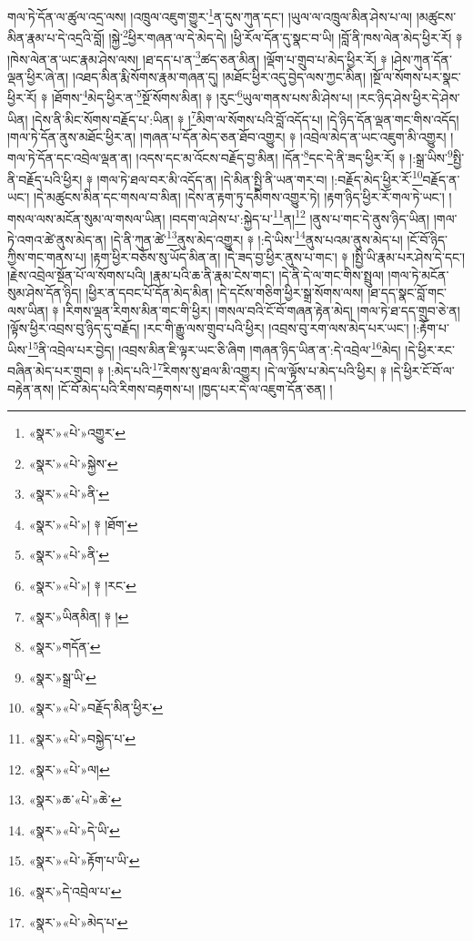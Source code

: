 གལ་ཏེ་དོན་ལ་ཚུལ་འདྲ་ལས། །འཁྲུལ་འཇུག་གྱུར་\footnote{«སྣར་»«པེ་»འགྱུར་}ན་དུས་ཀུན་དང་། །ཡུལ་ལ་འཁྲུལ་མིན་ཤེས་པ་ལ། །མཚུངས་མིན་རྣམ་པ་དེ་འདྲའི་བློ། །སྐྱེ་\footnote{«སྣར་»«པེ་»སྐྱེས་}ཕྱིར་གཞན་ལ་དེ་མེད་དེ། །ཕྱི་རོལ་དོན་དུ་སྣང་བ་ཡི། །བློ་ནི་ཁས་ལེན་མེད་ཕྱིར་རོ། ༈ །ཁེས་ལེན་ན་ཡང་རྣམ་ཤེས་ལས། །ཐ་དད་པ་ན་\footnote{«སྣར་»«པེ་»ནི་}ཚད་ཅན་མིན། །ལྡོག་པ་གྲུབ་པ་མེད་ཕྱིར་རོ། ༈ །ཤེས་ཀུན་དོན་ལྡན་ཕྱིར་ཞེ་ན། །འཐད་མིན་རྨི་སོགས་རྣམ་གཞན་དུ། །མཐོང་ཕྱིར་འདུ་བྱེད་ལས་ཀྱང་མིན། །སྔོ་ལ་སོགས་པར་སྣང་ཕྱིར་རོ། ༈ །ཐོགས་\footnote{«སྣར་»«པེ་»། ༈ །ཐོག་}མེད་ཕྱིར་ན་\footnote{«སྣར་»«པེ་»ནི་}སྔོ་སོགས་མིན། ༈ །རུང་\footnote{«སྣར་»«པེ་»། ༈ །རང་}ཡུལ་གནས་པས་མི་ཤེས་པ། །རང་ཉིད་ཤེས་ཕྱིར་དེ་ཤེས་ཡིན། །དེས་ནི་མིང་སོགས་བརྗོད་པ་:ཡིན། ༈ །\footnote{«སྣར་»ཡིནམིན། ༈ །}མིག་ལ་སོགས་པའི་བློ་འདོད་པ། །དེ་ཉིད་དོན་ལྡན་གང་གིས་འདོད། །གལ་ཏེ་དོན་ནུས་མཐོང་ཕྱིར་ན། །གཞན་པ་དོན་མེད་ཅན་ཐོབ་འགྱུར། ༈ །འབྲེལ་མེད་ན་ཡང་འཇུག་མི་འགྱུར། །གལ་ཏེ་དོན་དང་འབྲེལ་ལྡན་ན། །འདས་དང་མ་འོངས་བརྗོད་བྱ་མིན། །དོན་\footnote{«སྣར་»གདོན་}དང་དེ་ནི་ཟད་ཕྱིར་རོ། ༈ །:སྒྲ་ཡིས་\footnote{«སྣར་»སྒྲ་ཡི་}སྤྱི་ནི་བརྗོད་པའི་ཕྱིར། ༈ །གལ་ཏེ་ཐལ་བར་མི་འདོད་ན། །དེ་མིན་སྤྱི་ནི་ཡན་གར་བ། །:བརྗོད་མེད་ཕྱིར་རོ་\footnote{«སྣར་»«པེ་»བརྗོད་མིན་ཕྱིར་}བརྗོད་ན་ཡང་། །དེ་མཚུངས་མིན་དང་གསལ་བ་མིན། །དེས་ན་རྟག་ཏུ་དམིགས་འགྱུར་ཏེ། །རྟག་ཉིད་ཕྱིར་རོ་གལ་ཏེ་ཡང་། །གསལ་ལས་མངོན་སུམ་ལ་གསལ་ཡིན། །བདག་ལ་ཤེས་པ་:སྐྱེད་པ་\footnote{«སྣར་»«པེ་»བསྐྱེད་པ་}ན།\footnote{«སྣར་»«པེ་»ལ།} །ནུས་པ་གང་དེ་ནུས་ཉིད་ཡིན། །གལ་ཏེ་འགའ་ཚེ་ནུས་མེད་ན། །དེ་ནི་ཀུན་ཚེ་\footnote{«སྣར་»ཆ་«པེ་»ཆེ་}ནུས་མེད་འགྱུར། ༈ །:དེ་ཡིས་\footnote{«སྣར་»«པེ་»དེ་ཡི་}ནུས་པའམ་ནུས་མེད་པ། །ངོ་བོ་ཉིད་ཀྱིས་གང་གནས་པ། །རྟག་ཕྱིར་བཅོས་སུ་ཡོད་མིན་ན། །དེ་ཟད་བྱ་ཕྱིར་ནུས་པ་གང་། ༈ །སྤྱི་ཡི་རྣམ་པར་ཤེས་དེ་དང་། །རྗེས་འབྲེལ་སྔོན་པོ་ལ་སོགས་པའི། །རྣམ་པའི་ཆ་ནི་རྣམ་ངེས་གང་། །དེ་ནི་དེ་ལ་གང་གིས་སྤྲུལ། །གལ་ཏེ་མངོན་སུམ་ཤེས་དོན་ཉིད། །ཕྱིར་ན་དབང་པོ་དོན་མེད་མིན། །དེ་དངོས་གཅིག་ཕྱིར་སྒྲ་སོགས་ལས། །ཐ་དད་སྣང་བློ་གང་ལས་ཡིན། ༈ །རིགས་ལྡན་རིགས་མིན་གང་གི་ཕྱིར། །གསལ་བའི་ངོ་བོ་གཞན་རྟེན་མེད། །གལ་ཏེ་ཐ་དད་གྲུབ་ཅེ་ན། །ལྟོས་ཕྱིར་འབྲས་བུ་ཉིད་དུ་བརྗོད། །རང་གི་རྒྱུ་ལས་གྲུབ་པའི་ཕྱིར། །འབྲས་བུ་རག་ལས་མེད་པར་ཡང་། །:རྟོག་པ་ཡིས་\footnote{«སྣར་»«པེ་»རྟོག་པ་ཡི་}ནི་འབྲེལ་པར་བྱེད། །འབྲས་མིན་ཇི་ལྟར་ཡང་ཅི་ཞིག །གཞན་ཉིད་ཡིན་ན་:དེ་འབྲེལ་\footnote{«སྣར་»དེ་འབྲེལ་པ་}མེད། །དེ་ཕྱིར་རང་བཞིན་མེད་པར་གྲུབ། ༈ །:མེད་པའི་\footnote{«སྣར་»«པེ་»མེད་པ་}རིགས་སུ་ཐལ་མི་འགྱུར། །དེ་ལ་ལྟོས་པ་མེད་པའི་ཕྱིར། ༈ །དེ་ཕྱིར་ངོ་བོ་ལ་བརྟེན་ནས། །ངོ་བོ་མེད་པའི་རིགས་བརྟགས་པ། །ཁྱད་པར་དེ་ལ་འཇུག་དོན་ཅན། །
